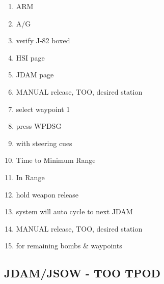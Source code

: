 \documentclass[fontInter]{TechCheck}
\begin{document}
	\begin{enumerate}
		\item {}\dotfill ARM
		\item {}\dotfill A/G
		\item {}\dotfill verify J-82 boxed
		\item {}\dotfill HSI page
		\item {}\dotfill JDAM page
		\item {}\dotfill MANUAL release, TOO, desired station
		\item {}\dotfill select waypoint 1
		\item {}\dotfill press WPDSG
		\item {}\dotfill with steering cues
		\item {}\dotfill Time to Minimum Range
		\item {}\dotfill In Range
		\item {}\dotfill hold weapon release
		\item {}\dotfill system will auto cycle to next JDAM
		\item {}\dotfill MANUAL release, TOO, desired station
		\item {}\dotfill for remaining bombs \& waypoints
	\end{enumerate}

	\subsection{JDAM/JSOW - TOO TPOD}
	
\end{document}
